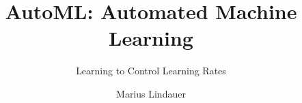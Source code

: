 




\title[AutoML: Learning to Control]{AutoML: Automated Machine Learning}
\subtitle{Learning to Control Learning Rates}
\author{Marius Lindauer}
\date{}





	
	\maketitle
	
